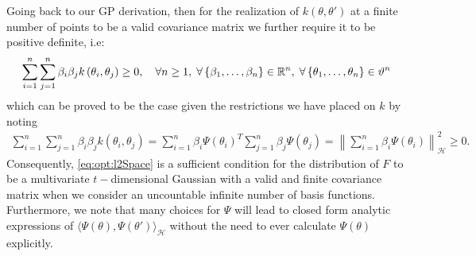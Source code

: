 Going back to our GP derivation, then for the realization of $k\left(\theta,\theta'\right)$ at a finite number of points to be a valid covariance matrix we further require it to be positive definite, i.e:
\begin{align}
\label{eq:opt:posDef}
\sum_{i=1}^{n} \sum_{j=1}^{n} \beta_i \beta_j k\left(\theta_i,\theta_j\right) \ge 0, \quad \forall n \ge 1, \; \forall \left\{\beta_1, \dots, \beta_n \right\}  \in \mathbb{R}^n, \; \forall \left\{\theta_1, \dots, \theta_n \right\} \in \vartheta^n
\end{align}
which can be proved to be the case given the restrictions we have placed on $k$ by noting
\begin{align}
\label{eq:opt:posDefProof}
\sum_{i=1}^{n} \sum_{j=1}^{n} \beta_i \beta_j k\left(\theta_i,\theta_j\right) = \sum_{i=1}^{n} \beta_i {\Psi\left(\theta_i\right)}^T \sum_{j=1}^{n} \beta_j \Psi\left(\theta_j\right) = \left\lVert \sum_{i=1}^{n} \beta_i \Psi\left(\theta_i\right) \right\rVert^2_\mathcal{H} \ge 0.
\end{align}
Consequently, \eqref{eq:opt:l2Space} is a sufficient condition for the distribution of $F$ to be a multivariate $t-$dimensional Gaussian with a valid and finite covariance matrix when we consider an uncountable infinite number of basis functions.  Furthermore, we note that many choices for $\Psi$ will lead to closed form analytic expressions of $\langle\Psi\left(\theta\right), \Psi\left(\theta'\right)\rangle_{\mathcal{H}}$ without the need to ever calculate $\Psi\left(\theta\right)$ explicitly.  

